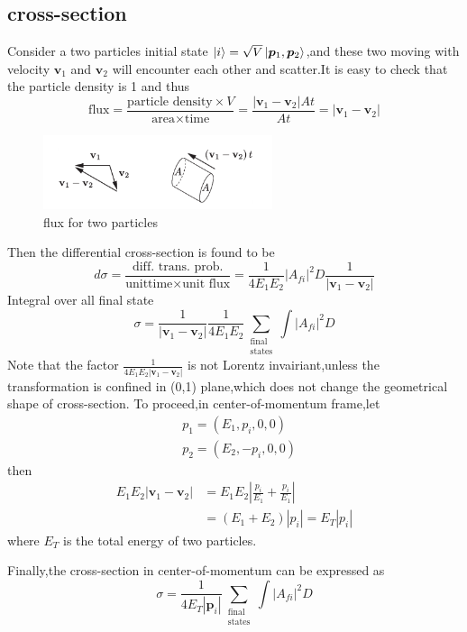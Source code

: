 \documentclass[a4paper]{article}
\begin{document}
\subsection{cross-section}
Consider a two particles initial state $\ket{i}=\sqrt{V}\ket{\bm{p}_1,\bm{p}_2}$,and these two moving with velocity $\bm{v}_1$ and $\bm{v}_2$ will encounter each other and scatter.It is easy to check that the particle density is 1 and thus$$\text{flux}=\frac{\text{particle density}\times V}{\text{area}\times\text{time}}=\frac{|\bm{v}_1-\bm{v}_2|At}{At}=|\bm{v}_1-\bm{v}_2|$$
\begin{figure}[htbp]
	\centering
	\includegraphics[width=0.6\textwidth]{17.png}
	\caption{flux for two particles}
\end{figure}
Then the differential cross-section is found to be$$d\sigma=\frac{\text{diff. trans. prob.}}{\text{unittime}\times\text{unit flux}}=\frac{1}{4E_1E_2}|A_{fi}|^2D\frac{1}{|\bm{v}_1-\bm{v}_2|}$$
Integral over all final state$$\sigma=\frac{1}{|\bm{v}_1-\bm{v}_2|}\frac{1}{4E_1E_2}\sum_{\substack{\text{final}\\ \text{states}}}\int|A_{fi}|^2D$$
Note that the factor $\frac{1}{4E_1E_2|\bm{v}_1-\bm{v}_2|}$ is not Lorentz invairiant,unless the transformation is confined in (0,1) plane,which does not change the geometrical shape of cross-section.
To proceed,in center-of-momentum frame,let
\begin{align*}
	&p_1=(E_1,p_i,0,0)\\
	&p_2=(E_2,-p_i,0,0)
\end{align*}
then
\begin{align*}
	E_1E_2|\bm{v}_1-\bm{v}_2|&=E_1E_2|\frac{p_i}{E_1}+\frac{p_i}{E_1}|\\&=(E_1+E_2)|p_i|=E_T|p_i|
\end{align*}
where $E_T$ is the total energy of two particles.
\par Finally,the cross-section in center-of-momentum can be expressed as$$\sigma=\frac{1}{4E_T|\bm{p}_i|}\sum_{\substack{\text{final}\\ \text{states}}}\int|A_{fi}|^2D$$
\end{document}
